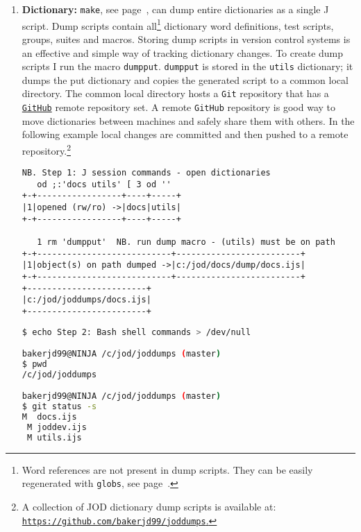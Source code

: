 \begin{enumerate}
\item \textbf{Dictionary:}\label{it:dictlev} \texttt{make}, see page~\pageref{ss:make}, can dump entire
dictionaries as a single J script. Dump scripts contain all\footnote{Word references 
are not present in dump scripts. They can
be easily regenerated with \texttt{globs}, see page~\pageref{ss:globs}.} dictionary word definitions,
test scripts, groups, suites and macros. Storing dump scripts in version control systems is
an effective and simple way of tracking dictionary changes.  To create dump scripts I run
the macro \texttt{dumpput}.
\texttt{dumpput} is stored in the \texttt{utils} dictionary; it dumps the put dictionary and
copies the generated script to a common local directory. The common local directory
hosts a \texttt{Git} repository that has a \href{https://github.com/bakerjd99/joddumps}{\texttt{GitHub}} remote repository set.
A remote \texttt{GitHub}  repository is good way to move dictionaries between machines
and safely share them with others. In the following example local changes
are committed and then pushed to a remote repository.\footnote{
  A collection of JOD dictionary dump scripts is available at: \href{https://github.com/bakerjd99/joddumps}{\texttt{https://github.com/bakerjd99/joddumps}.}
}


\begin{lstlisting}[frame=single,framerule=0pt,basicstyle=\ttfamily\footnotesize]
   NB. Step 1: J session commands - open dictionaries
   od ;:'docs utils' [ 3 od ''
+-+-----------------+----+-----+
|1|opened (rw/ro) ->|docs|utils|
+-+-----------------+----+-----+
   
   1 rm 'dumpput'  NB. run dump macro - (utils) must be on path
+-+---------------------------+-------------------------+
|1|object(s) on path dumped ->|c:/jod/docs/dump/docs.ijs|
+-+---------------------------+-------------------------+
+------------------------+
|c:/jod/joddumps/docs.ijs|
+------------------------+
\end{lstlisting}

\begin{lstlisting}[language=bash,frame=single,framerule=0pt
,basicstyle=\ttfamily\footnotesize,backgroundcolor=\color{CodeBackGround}]
$ echo Step 2: Bash shell commands > /dev/null

bakerjd99@NINJA /c/jod/joddumps (master)
$ pwd
/c/jod/joddumps

bakerjd99@NINJA /c/jod/joddumps (master)
$ git status -s
M  docs.ijs
 M joddev.ijs
 M utils.ijs


\end{lstlisting}
\end{enumerate}
